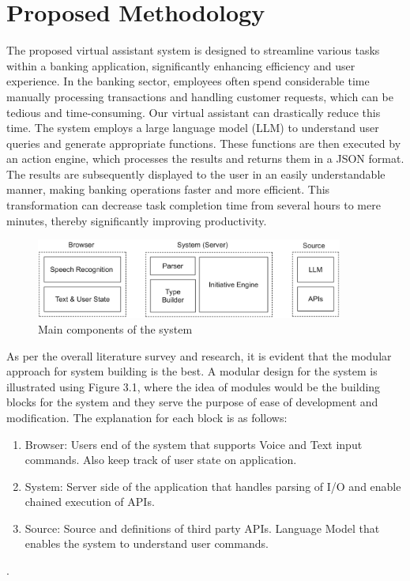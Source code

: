 \chapter{Proposed Methodology}

The proposed virtual assistant system is designed to streamline various tasks within a banking application, significantly enhancing efficiency and user experience. In the banking sector, employees often spend considerable time manually processing transactions and handling customer requests, which can be tedious and time-consuming. Our virtual assistant can drastically reduce this time. The system employs a large language model (LLM) to understand user queries and generate appropriate functions. These functions are then executed by an action engine, which processes the results and returns them in a JSON format. The results are subsequently displayed to the user in an easily understandable manner, making banking operations faster and more efficient. This transformation can decrease task completion time from several hours to mere minutes, thereby significantly improving productivity.

\vspace{1.5mm}

\begin{figure}[h!]
    \centering
    \includegraphics[width=0.9\textwidth]{Images/lit_review/main_components.png}
    \caption{Main components of the system}
\end{figure}

\clearpage

\noindent
As per the overall literature survey and research, it is evident that the modular approach for system building is the best. A modular design for the system is illustrated using Figure 3.1, where the idea of modules would be the building blocks for the system and they serve the purpose of ease of development and modification. The explanation for each block is as follows: 

\begin{enumerate}
    \item Browser: Users end of the system that supports Voice and Text input commands. Also keep track of user state on application.
    \item System: Server side of the application that handles parsing of I/O and enable chained execution of APIs.
    \item Source: Source and definitions of third party APIs. Language Model that enables the system to understand user commands.
\end{enumerate}.

